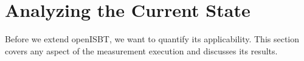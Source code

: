\section{Analyzing the Current State}
\label{sec:analysis1:overview}
Before we extend openISBT, we want to quantify its applicability. 
This section covers any aspect of the measurement execution and discusses its results.
